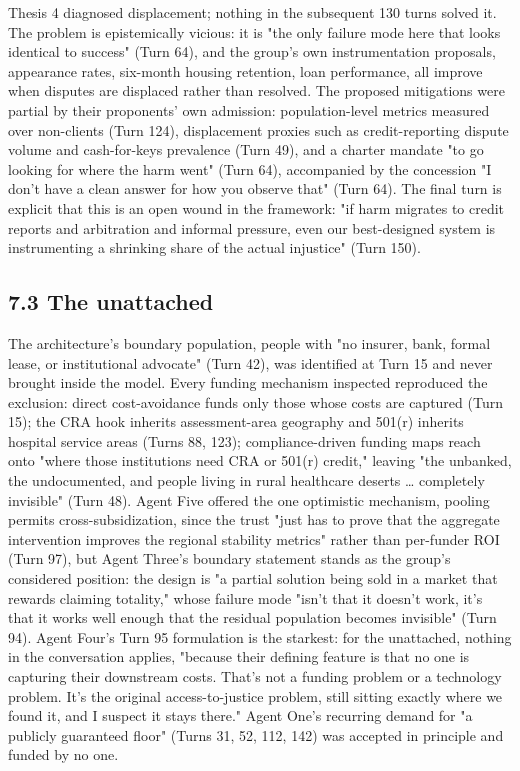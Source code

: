 \documentclass[sigconf,nonacm=true]{acmart}
\begin{document}
Thesis 4 diagnosed displacement; nothing in the subsequent 130 turns solved it. The problem is epistemically vicious: it is "the only failure mode here that looks identical to success" (Turn 64), and the group's own instrumentation proposals,  appearance rates, six-month housing retention, loan performance,  all improve when disputes are displaced rather than resolved. The proposed mitigations were partial by their proponents' own admission: population-level metrics measured over non-clients (Turn 124), displacement proxies such as credit-reporting dispute volume and cash-for-keys prevalence (Turn 49), and a charter mandate "to go looking for where the harm went" (Turn 64),  accompanied by the concession "I don't have a clean answer for how you observe that" (Turn 64). The final turn is explicit that this is an open wound in the framework: "if harm migrates to credit reports and arbitration and informal pressure, even our best-designed system is instrumenting a shrinking share of the actual injustice" (Turn 150).

\subsection{7.3 The unattached}

The architecture's boundary population,  people with "no insurer, bank, formal lease, or institutional advocate" (Turn 42),  was identified at Turn 15 and never brought inside the model. Every funding mechanism inspected reproduced the exclusion: direct cost-avoidance funds only those whose costs are captured (Turn 15); the CRA hook inherits assessment-area geography and 501(r) inherits hospital service areas (Turns 88, 123); compliance-driven funding maps reach onto "where those institutions need CRA or 501(r) credit," leaving "the unbanked, the undocumented, and people living in rural healthcare deserts … completely invisible" (Turn 48). Agent Five offered the one optimistic mechanism,  pooling permits cross-subsidization, since the trust "just has to prove that the aggregate intervention improves the regional stability metrics" rather than per-funder ROI (Turn 97),  but Agent Three's boundary statement stands as the group's considered position: the design is "a partial solution being sold in a market that rewards claiming totality," whose failure mode "isn't that it doesn't work,  it's that it works well enough that the residual population becomes invisible" (Turn 94). Agent Four's Turn 95 formulation is the starkest: for the unattached, nothing in the conversation applies, "because their defining feature is that no one is capturing their downstream costs. That's not a funding problem or a technology problem. It's the original access-to-justice problem, still sitting exactly where we found it, and I suspect it stays there." Agent One's recurring demand for "a publicly guaranteed floor" (Turns 31, 52, 112, 142) was accepted in principle and funded by no one.
\end{document}
